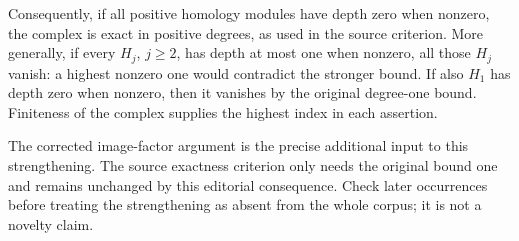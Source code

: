 Consequently, if all positive homology modules have depth zero when nonzero, the complex is exact in positive degrees, as used in the source criterion. More generally, if every \(H_j\), \(j\ge2\), has depth at most one when nonzero, all those \(H_j\) vanish: a highest nonzero one would contradict the stronger bound. If also \(H_1\) has depth zero when nonzero, then it vanishes by the original degree-one bound. Finiteness of the complex supplies the highest index in each assertion.

The corrected image-factor argument is the precise additional input to this strengthening. The source exactness criterion only needs the original bound one and remains unchanged by this editorial consequence. Check later occurrences before treating the strengthening as absent from the whole corpus; it is not a novelty claim.
